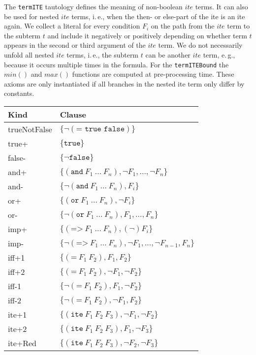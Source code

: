 \documentclass[a4paper]{article}
\newcommand\smtlib[1]{\texttt{#1}}
\begin{document}
The \texttt{termITE} tautology defines the meaning of non-boolean
$ite$ terms.  It can also be used for nested $ite$ terms, i.\,e., when
the then- or else-part of the ite is an ite again.  We collect a
literal for every condition $F_i$ on the path from the $ite$ term to
the subterm $t$ and include it negatively or positively depending on
whether term $t$ appears in the second or third argument of the $ite$
term.  We do not necessarily unfold all nested $ite$ terms, i.\,e., the
subterm $t$ can be another $ite$ term, e.\,g., because it occurs
multiple times in the formula.
For the \texttt{termITEBound} the $min()$ and $max()$
functions are computed at pre-processing time.  These axioms are only
instantiated if all branches in the nested ite term only differ by
constants.
\begin{table}[htbp]
  \begin{tabular}{l|l}
    Kind & Clause\\\hline
    trueNotFalse & $\{\neg(\smtlib{= true false})\}$\\
    true+ & $\{\smtlib{true}\}$\\
    false- & $\{\neg\smtlib{false}\}$\\
    and+ & $\{(\smtlib{and}\ F_1\ \ldots\ F_n), \neg F_1, \ldots, \neg F_n\}$\\
    and- & $\{\neg(\smtlib{and}\ F_1\ \ldots\ F_n), F_i\}$\\
    or+ & $\{(\smtlib{or}\ F_1\ \ldots\ F_n), \neg F_i\}$\\
    or- & $\{\neg(\smtlib{or}\ F_1\ \ldots\ F_n), F_1, \ldots, F_n\}$\\
    imp+ & $\{(\smtlib{=>}\ F_1\ \ldots\ F_n), (\neg) F_i\}$\\
    imp- & $\{\neg(\smtlib{=>}\ F_1\ \ldots\ F_n), \neg F_1, \ldots, \neg F_{n-1}, F_n\}$\\
    iff+1 & $\{(\smtlib{=}\ F_1\ F_2), F_1, F_2\}$\\
    iff+2 & $\{(\smtlib{=}\ F_1\ F_2),\neg F_1, \neg F_2\}$\\
    iff-1 & $\{\neg(\smtlib{=}\ F_1\ F_2), F_1, \neg F_2\}$\\
    iff-2 & $\{\neg(\smtlib{=}\ F_1\ F_2),\neg F_1, F_2\}$\\
    ite+1 & $\{(\smtlib{ite}\ F_1\ F_2\ F_3),\neg F_1,\neg F_2\}$\\
    ite+2 & $\{(\smtlib{ite}\ F_1\ F_2\ F_3), F_1,\neg F_3\}$\\
    ite+Red & $\{(\smtlib{ite}\ F_1\ F_2\ F_3),\neg F_2,\neg F_3\}$\\

\end{tabular}
\end{table}
\end{document}

